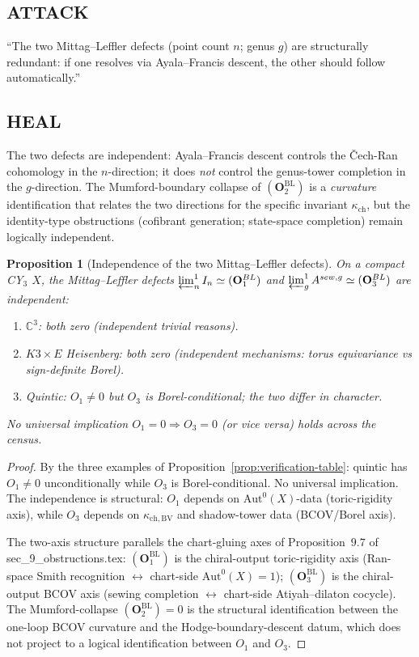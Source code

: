 \documentclass[11pt]{amsart}
\newtheorem{proposition}[theorem]{Proposition}
\newcommand{\kch}{\kappa_{\mathrm{ch}}}
\newcommand{\kchBV}{\kappa_{\mathrm{ch},\mathrm{BV}}}
\newcommand{\bC}{\mathbb{C}}
\newcommand{\Aut}{\mathrm{Aut}}
\begin{document}
\subsection*{ATTACK}

``The two Mittag--Leffler defects (point count $n$; genus $g$) are
structurally redundant: if one resolves via Ayala--Francis descent,
the other should follow automatically.''

\subsection*{HEAL}

The two defects are independent: Ayala--Francis descent controls
the \v{C}ech-Ran cohomology in the $n$-direction; it does \emph{not}
control the genus-tower completion in the $g$-direction. The
Mumford-boundary collapse of $(\mathbf{O}_2^{\mathrm{BL}})$ is a
\emph{curvature} identification that relates the two directions
for the specific invariant $\kch$, but the identity-type
obstructions (cofibrant generation; state-space completion) remain
logically independent.

\begin{proposition}[Independence of the two Mittag--Leffler defects]
\label{prop:ml-independence}
On a compact CY$_3$ $X$, the Mittag--Leffler defects
$\varprojlim^1_n I_n \simeq (\mathbf{O}_1^{\mathrm{BL}})$ and
$\varprojlim^1_g A^{\mathrm{sew}, g} \simeq (\mathbf{O}_3^{\mathrm{BL}})$
are independent:
\begin{enumerate}[leftmargin=2em]
\item $\bC^3$: both zero (independent trivial reasons).
\item $K3 \times E$ Heisenberg: both zero (independent mechanisms:
torus equivariance vs sign-definite Borel).
\item Quintic: $O_1 \neq 0$ but $O_3$ is Borel-conditional; the
two differ in character.
\end{enumerate}
No universal implication $O_1 = 0 \Rightarrow O_3 = 0$ (or vice
versa) holds across the census.
\end{proposition}

\begin{proof}
By the three examples of Proposition~\ref{prop:verification-table}:
quintic has $O_1 \neq 0$ unconditionally while $O_3$ is
Borel-conditional. No universal implication. The independence is
structural: $O_1$ depends on $\Aut^0(X)$-data (toric-rigidity axis),
while $O_3$ depends on $\kchBV$ and shadow-tower data
(BCOV/Borel axis).

The two-axis structure parallels the chart-gluing axes of
Proposition~$9.7$ of sec\_9\_obstructions.tex:
$(\mathbf{O}_1^{\mathrm{BL}})$ is the chiral-output toric-rigidity
axis (Ran-space Smith recognition $\leftrightarrow$ chart-side
$\Aut^0(X) = 1$); $(\mathbf{O}_3^{\mathrm{BL}})$ is the chiral-output
BCOV axis (sewing completion $\leftrightarrow$ chart-side
Atiyah--dilaton cocycle). The Mumford-collapse
$(\mathbf{O}_2^{\mathrm{BL}}) = 0$ is the structural identification
between the one-loop BCOV curvature and the Hodge-boundary-descent
datum, which does not project to a logical identification between
$O_1$ and $O_3$.
\end{proof}
\end{document}
